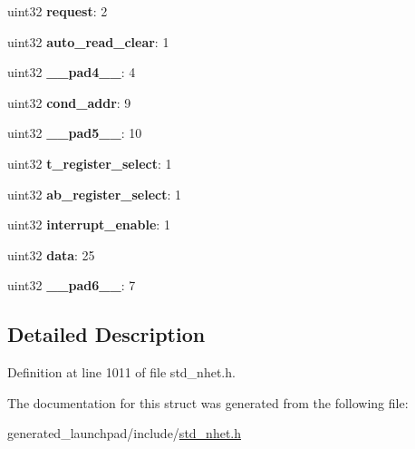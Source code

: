 \begin{DoxyCompactItemize}
\item 
\mbox{\label{structdjnz__format_ac20ac6dbdc237af173522cb09f7f497d}} 
uint32 {\bfseries request}\+: 2
\item 
\mbox{\label{structdjnz__format_adc3490ba84e4db47e6dda95b800bc552}} 
uint32 {\bfseries auto\+\_\+read\+\_\+clear}\+: 1
\item 
\mbox{\label{structdjnz__format_a8559efe4e0d8ba1e9d48a2c8251d142e}} 
uint32 {\bfseries \+\_\+\+\_\+pad4\+\_\+\+\_\+}\+: 4
\item 
\mbox{\label{structdjnz__format_a98a359b34fbfd101a196be7f8503fca5}} 
uint32 {\bfseries cond\+\_\+addr}\+: 9
\item 
\mbox{\label{structdjnz__format_a2bf030d705aad828aa126578c98bb62a}} 
uint32 {\bfseries \+\_\+\+\_\+pad5\+\_\+\+\_\+}\+: 10
\item 
\mbox{\label{structdjnz__format_a521787136ce7a56961a4edc3e45fa658}} 
uint32 {\bfseries t\+\_\+register\+\_\+select}\+: 1
\item 
\mbox{\label{structdjnz__format_a5d4a1547304a2b74e60d4dcf7f2e51a8}} 
uint32 {\bfseries ab\+\_\+register\+\_\+select}\+: 1
\item 
\mbox{\label{structdjnz__format_a8e8b3ae5b557efa0909689840ca3fc29}} 
uint32 {\bfseries interrupt\+\_\+enable}\+: 1
\item 
\mbox{\label{structdjnz__format_a24ea98c82b213f2cf9c68b6ceb756c28}} 
uint32 {\bfseries data}\+: 25
\item 
\mbox{\label{structdjnz__format_a3565d4a9ba63a928e971fdc9f83881a3}} 
uint32 {\bfseries \+\_\+\+\_\+pad6\+\_\+\+\_\+}\+: 7
\end{DoxyCompactItemize}


\subsection{Detailed Description}


Definition at line 1011 of file std\+\_\+nhet.\+h.



The documentation for this struct was generated from the following file\+:\begin{DoxyCompactItemize}
\item 
generated\+\_\+launchpad/include/\mbox{\hyperlink{std__nhet_8h}{std\+\_\+nhet.\+h}}\end{DoxyCompactItemize}
